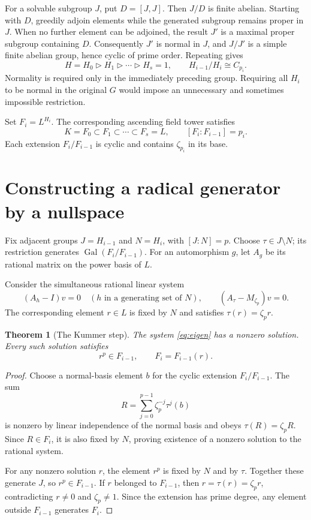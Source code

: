 \documentclass[11pt,a4paper]{article}
\newtheorem{theorem}{Theorem}[section]
\theoremstyle{definition}\newtheorem{definition}[theorem]{Definition}
\theoremstyle{remark}\newtheorem{remark}[theorem]{Remark}
\newcommand{\Gal}{\operatorname{Gal}}\newcommand{\Aut}{\operatorname{Aut}}
\begin{document}
For a solvable subgroup $J$, put $D=[J,J]$. Then $J/D$ is finite abelian.
Starting with $D$, greedily adjoin elements while the generated subgroup
remains proper in $J$. When no further element can be adjoined, the result
$J'$ is a maximal proper subgroup containing $D$. Consequently $J'$ is
normal in $J$, and $J/J'$ is a simple finite abelian group, hence cyclic of
prime order. Repeating gives
\[
 H=H_0\triangleright H_1\triangleright\cdots\triangleright H_s=1,
 \qquad H_{i-1}/H_i\cong C_{p_i}.
\]
Normality is required only in the immediately preceding group. Requiring all
$H_i$ to be normal in the original $G$ would impose an unnecessary and
sometimes impossible restriction.

Set $F_i=L^{H_i}$. The corresponding ascending field tower satisfies
\[
 K=F_0\subset F_1\subset\cdots\subset F_s=L,
 \qquad [F_i:F_{i-1}]=p_i.
\]
Each extension $F_i/F_{i-1}$ is cyclic and contains $\zeta_{p_i}$ in its base.

\section{Constructing a radical generator by a nullspace}
Fix adjacent groups $J=H_{i-1}$ and $N=H_i$, with $[J:N]=p$. Choose
$\tau\in J\setminus N$; its restriction generates $\Gal(F_i/F_{i-1})$.
For an automorphism $g$, let $A_g$ be its rational matrix on the power basis
of $L$.

Consider the simultaneous rational linear system
\begin{equation}\label{eq:eigen}
 (A_h-I)v=0\quad(h\text{ in a generating set of }N),\qquad
 (A_\tau-M_{\zeta_p})v=0.
\end{equation}
The corresponding element $r\in L$ is fixed by $N$ and satisfies
$\tau(r)=\zeta_p r$.

\begin{theorem}[The Kummer step]\label{thm:kummer}
The system \eqref{eq:eigen} has a nonzero solution. Every such solution
satisfies
\[
 r^p\in F_{i-1},\qquad F_i=F_{i-1}(r).
\]
\end{theorem}
\begin{proof}
Choose a normal-basis element $b$ for the cyclic extension $F_i/F_{i-1}$.
The sum
\[
 R=\sum_{j=0}^{p-1}\zeta_p^{-j}\tau^j(b)
\]
is nonzero by linear independence of the normal basis and obeys
$\tau(R)=\zeta_pR$. Since $R\in F_i$, it is also fixed by $N$, proving
existence of a nonzero solution to the rational system.

For any nonzero solution $r$, the element $r^p$ is fixed by $N$ and by
$\tau$. Together these generate $J$, so $r^p\in F_{i-1}$. If $r$ belonged
to $F_{i-1}$, then $r=\tau(r)=\zeta_p r$, contradicting $r\ne0$ and
$\zeta_p\ne1$. Since the extension has prime degree, any element outside
$F_{i-1}$ generates $F_i$.
\end{proof}
\end{document}
